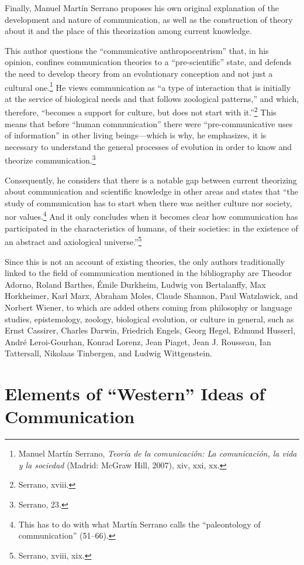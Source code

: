 \documentclass{tufte-handout}
\begin{document}
Finally, Manuel Martín Serrano proposes his own original explanation of
the development and nature of communication, as well as the construction
of theory about it and the place of this theorization among current
knowledge.

This author questions the ``communicative anthropocentrism'' that, in
his opinion, confines communication theories to a ``pre-scientific''
state, and defends the need to develop theory from an evolutionary
conception and not just a cultural one.\footnote{Manuel Martín Serrano,
  \emph{Teoría de la comunicación: La comunicación, la vida y la
  sociedad} (Madrid: McGraw Hill, 2007), xiv, xxi, xx.} He views
communication as ``a type of interaction that is initially at the
service of biological needs and that follows zoological patterns,'' and
which, therefore, ``becomes a support for culture, but does not start
with it.''\footnote{Serrano, xviii.} This means that before ``human
communication'' there were ``pre-communicative uses of information'' in
other living beings---which is why, he emphasizes, it is necessary to
understand the general processes of evolution in order to know and
theorize communication.\footnote{Serrano, 23.}

Consequently, he considers that there is a notable gap between current
theorizing about communication and scientific knowledge in other areas
and states that ``the study of communication has to start when there was
neither culture nor society, nor values.\footnote{This has to do with
  what Martín Serrano calls the ``paleontology of communication''
  (51--66).} And it only concludes when it becomes clear how
communication has participated in the characteristics of humans, of
their societies: in the existence of an abstract and axiological
universe.''\footnote{Serrano, xviii, xix.}

Since this is not an account of existing theories, the only authors
traditionally linked to the field of communication mentioned in the
bibliography are Theodor Adorno, Roland Barthes, Émile Durkheim, Ludwig
von Bertalanffy, Max Horkheimer, Karl Marx, Abraham Moles, Claude
Shannon, Paul Watzlawick, and Norbert Wiener, to which are added others
coming from philosophy or language studies, epistemology, zoology,
biological evolution, or culture in general, such as Ernst Cassirer,
Charles Darwin, Friedrich Engels, Georg Hegel, Edmund Husserl, André
Leroi-Gourhan, Konrad Lorenz, Jean Piaget, Jean J. Rousseau, Ian
Tattersall, Nikolaas Tinbergen, and Ludwig Wittgenstein.

\hypertarget{elements-of-western-ideas-of-communication-and-communication}{%
\section{Elements of ``Western'' Ideas of Communication}\label{elements-of-western-ideas-of-communication-and-communication}}
\end{document}
